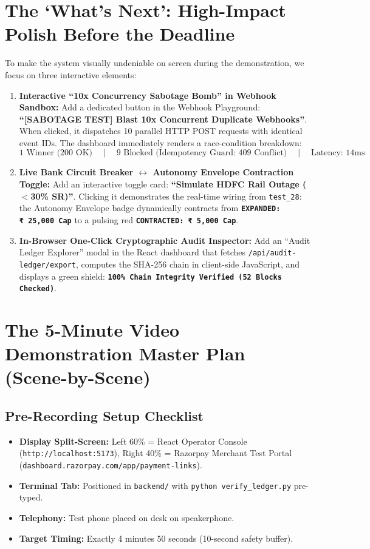 \documentclass[11pt, a4paper]{article}
\newcommand{\INR}{{\rupeefont ₹}}
\begin{document}
\newpage
\section{The `What's Next': High-Impact Polish Before the Deadline}

To make the system visually undeniable on screen during the demonstration, we focus on three interactive elements:

\begin{enumerate}[leftmargin=1.5em, itemsep=8pt]
  \item \textbf{Interactive ``10x Concurrency Sabotage Bomb'' in Webhook Sandbox:}
  Add a dedicated button in the Webhook Playground: \textbf{``[SABOTAGE TEST] Blast 10x Concurrent Duplicate Webhooks''}. When clicked, it dispatches 10 parallel HTTP POST requests with identical event IDs. The dashboard immediately renders a race-condition breakdown:
  \[
    \text{1 Winner (200 OK)} \quad\mid\quad \text{9 Blocked (Idempotency Guard: 409 Conflict)} \quad\mid\quad \text{Latency: 14ms}
  \]
  
  \item \textbf{Live Bank Circuit Breaker $\leftrightarrow$ Autonomy Envelope Contraction Toggle:}
  Add an interactive toggle card: \textbf{``Simulate HDFC Rail Outage ($<$30\% SR)''}. Clicking it demonstrates the real-time wiring from \texttt{test\_28}: the Autonomy Envelope badge dynamically contracts from \textbf{\texttt{EXPANDED: \INR~25,000 Cap}} to a pulsing red \textbf{\texttt{CONTRACTED: \INR~5,000 Cap}}.
  
  \item \textbf{In-Browser One-Click Cryptographic Audit Inspector:}
  Add an ``Audit Ledger Explorer'' modal in the React dashboard that fetches \texttt{/api/audit-ledger/export}, computes the SHA-256 chain in client-side JavaScript, and displays a green shield: \textbf{\texttt{100\% Chain Integrity Verified (52 Blocks Checked)}}.
\end{enumerate}

\section{The 5-Minute Video Demonstration Master Plan (Scene-by-Scene)}

\subsection{Pre-Recording Setup Checklist}
\begin{itemize}[leftmargin=1.5em, itemsep=2pt]
  \item \textbf{Display Split-Screen:} Left 60\% = React Operator Console (\texttt{http://localhost:5173}), Right 40\% = Razorpay Merchant Test Portal (\texttt{dashboard.razorpay.com/app/payment-links}).
  \item \textbf{Terminal Tab:} Positioned in \texttt{backend/} with \texttt{python verify\_ledger.py} pre-typed.
  \item \textbf{Telephony:} Test phone placed on desk on speakerphone.
  \item \textbf{Target Timing:} Exactly 4 minutes 50 seconds (10-second safety buffer).
\end{itemize}
\end{document}
